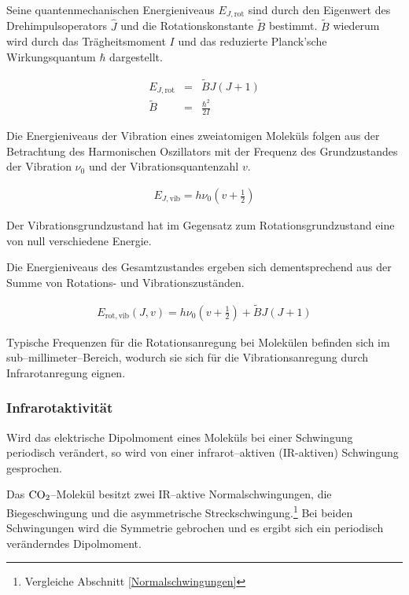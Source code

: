\documentclass[12pt,a4paper]{scrartcl}
\numberwithin{equation}{section} %
\begin{document}
Seine quantenmechanischen Energieniveaus $E_{J, \mathrm{rot}}$ sind durch den Eigenwert des Drehimpulsoperators $\hat J$ und die Rotationskonstante $\tilde{B}$ bestimmt. $\tilde{B}$  wiederum wird durch das Trägheitsmoment $I$ und das reduzierte Planck'sche Wirkungsquantum $\hbar$ dargestellt.

\begin{eqnarray}
  E_{J, \mathrm{rot}} &=& \tilde{B} J (J + 1) \\
  \tilde{B} &=& \frac{\hbar^2}{2 I}
\end{eqnarray}

\noindent
Die Energieniveaus der Vibration eines zweiatomigen Moleküls folgen aus der Betrachtung des Harmonischen Oszillators mit der Frequenz des Grundzustandes der Vibration $\nu_0$ und der Vibrationsquantenzahl $v$.

\begin{eqnarray}
  E_{J, \mathrm{vib}} = h \nu_0\left(v + \frac{1}{2}\right)
\end{eqnarray}

\noindent
Der Vibrationsgrundzustand hat im Gegensatz zum Rotationsgrundzustand eine von null verschiedene Energie.

Die Energieniveaus des Gesamtzustandes ergeben sich dementsprechend aus der Summe von Rotations- und Vibrationszuständen.

\begin{eqnarray}
  E_\mathrm{rot,vib}(J,v) = h \nu_0 \left(v + \frac{1}{2}\right) + \tilde{B} J (J + 1) \label{eq:E rot,vib}
\end{eqnarray}

\noindent
Typische Frequenzen für die Rotationsanregung bei Molekülen befinden sich im sub--millimeter--Bereich, wodurch sie sich für die Vibrationsanregung durch Infrarotanregung eignen.

\hypertarget{infrarotaktivituxe4t}{\subsubsection{Infrarotaktivität}\label{infrarotaktivituxe4t}}
Wird das elektrische Dipolmoment eines Moleküls bei einer Schwingung periodisch verändert, so wird von einer infrarot--aktiven (IR-aktiven) Schwingung gesprochen.

Das $\ce{CO_2}$--Molekül besitzt zwei  IR--aktive Normalschwingungen, die Biegeschwingung und die asymmetrische Streckschwingung.\footnote{Vergleiche Abschnitt \ref{Normalschwingungen}} Bei beiden Schwingungen wird die Symmetrie gebrochen und es ergibt sich ein periodisch veränderndes Dipolmoment.
\end{document}
